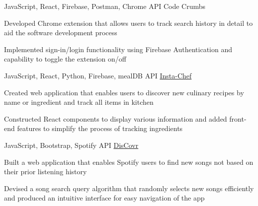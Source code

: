 \documentclass[12pt, letterpaper]{awesome-cv}
\begin{document}
\begin{cventries}

    \cventry
        {JavaScript, React, Firebase, Postman, Chrome API} %
        {Code Crumbs} %
        {} %
        {} %
        {
          \begin{cvitems} %
          	\item {Developed Chrome extension that allows users to track search history in detail to aid the software development process}
    		    \item {Implemented sign-in/login functionality using Firebase Authentication and capability to toggle the extension on/off}
          \end{cvitems}
        }

  \cventry
    {JavaScript, React, Python, Firebase, mealDB API} %
    {\href{https://insta-chef-ba8dc.web.app}{Insta-Chef}} %
    {} %
    {} %
    {
      \begin{cvitems} %
      	\item {Created web application that enables users to discover new culinary recipes by name or ingredient and track all items in kitchen}
      	\item {Constructed React components to display various information and added front-end features to simplify the process of tracking ingredients}
      \end{cvitems}
    }
    
    \cventry
    {JavaScript, Bootstrap, Spotify API} %
    {\href{https://discovr.netlify.app}{DisCovr}} %
    {} %
    {} %
    {
      \begin{cvitems} %
      	\item {Built a web application that enables Spotify users to find new songs not based on their prior listening history}
		\item {Devised a song search query algorithm that randomly selects new songs efficiently and produced an intuitive interface for easy navigation of the app}
      \end{cvitems}
    }
    

\end{cventries}
\end{document}
